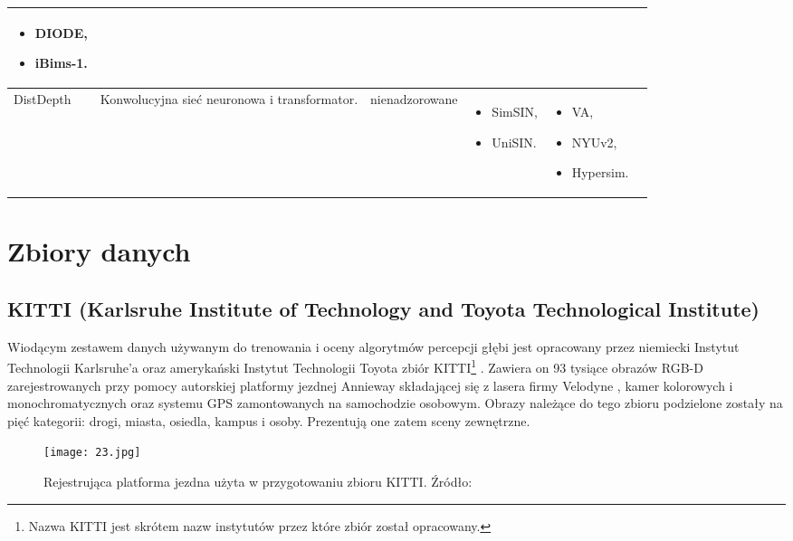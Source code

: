 \begin{table}[H]
{\begin{tabular}{ |l|p{2cm}|p{3cm}|p{5cm}|p{5cm}|r| }
\begin{itemize}
            \item DIODE,
            \item iBims-1.
        \end{itemize}\\
        \hline
        DistDepth &
        Konwolucyjna sieć neuronowa i transformator. &
        nienadzorowane &
        \begin{itemize}
            \item SimSIN,
            \item UniSIN.
        \end{itemize} & 
        \begin{itemize}
            \item VA,
            \item NYUv2,
            \item Hypersim.
        \end{itemize}\\
        \hline
        \end{tabular}%
    }
    \label{tabela_podsumowanie_algorytmy_2}
\end{table}

\section{Zbiory danych}
\subsection{KITTI (Karlsruhe Institute of Technology and Toyota Technological Institute)}
Wiodącym zestawem danych używanym do trenowania i oceny algorytmów percepcji głębi jest opracowany przez niemiecki Instytut Technologii Karlsruhe'a oraz amerykański Instytut Technologii Toyota zbiór KITTI\footnote{Nazwa KITTI jest skrótem nazw instytutów przez które zbiór został opracowany.} \cite{geiger2012}. Zawiera on 93 tysiące obrazów RGB-D zarejestrowanych przy pomocy autorskiej platformy jezdnej Annieway składającej się z lasera firmy Velodyne \cite{Velodyne}, kamer kolorowych i monochromatycznych oraz systemu GPS zamontowanych na samochodzie osobowym. Obrazy należące do tego zbioru podzielone zostały na pięć kategorii: drogi, miasta, osiedla, kampus i osoby. Prezentują one zatem sceny zewnętrzne.
\begin{figure}[H]
    \centering
    \texttt{[image: 23.jpg]}
    \caption{Rejestrująca platforma jezdna użyta w przygotowaniu zbioru KITTI. Źródło: \cite{geiger2012}}
    \label{fig:kitti-annieway}
\end{figure}
